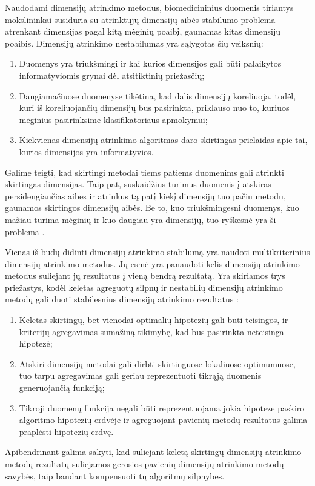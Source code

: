 Naudodami dimensijų atrinkimo metodus, biomedicininius duomenis tiriantys mokslininkai susiduria su atrinktųjų dimensijų aibės stabilumo problema - atrenkant dimensijas pagal kitą mėginių poaibį, gaunamas kitas dimensijų poaibis. Dimensijų atrinkimo nestabilumas yra sąlygotas šių veiksnių:
\begin{enumerate}
 \item Duomenys yra triukšmingi ir kai kurios dimensijos gali būti palaikytos informatyviomis grynai dėl atsitiktinių priežasčių;
 \item Daugiamačiuose duomenyse tikėtina, kad dalis dimensijų koreliuoja, todėl, kuri iš koreliuojančių dimensijų bus pasirinkta, priklauso nuo to, kuriuos mėginius pasirinksime klasifikatoriaus apmokymui;
 \item Kiekvienas dimensijų atrinkimo algoritmas daro skirtingas prielaidas apie tai, kurios dimensijos yra informatyvios.
\end{enumerate}
Galime teigti, kad skirtingi metodai tiems patiems duomenims gali atrinkti skirtingas dimensijas. Taip pat, suskaidžius turimus duomenis į atskiras persidengiančias aibes ir atrinkus tą patį kiekį dimensijų tuo pačiu metodu, gaunamos skirtingos dimensijų aibės. Be to, kuo triukšmingesni duomenys, kuo mažiau turima mėginių ir kuo daugiau yra dimensijų, tuo ryškesnė yra ši problema \cite{loscalzo2009consensus}. 

Vienas iš būdų didinti dimensijų atrinkimo stabilumą yra naudoti multikriterinius dimensijų atrinkimo metodus. Jų esmė yra panaudoti kelis dimensijų atrinkimo metodus suliejant jų rezultatus į vieną bendrą rezultatą. Yra skiriamos trys priežastys, kodėl keletas agreguotų silpnų ir nestabilių dimensijų atrinkimo metodų gali duoti stabilesnius dimensijų atrinkimo rezultatus \cite{dietterich2000ensemble}:
\begin{enumerate}
 \item Keletas skirtingų, bet vienodai optimalių hipotezių gali būti teisingos, ir kriterijų agregavimas sumažiną tikimybę, kad bus pasirinkta neteisinga  hipotezė;
 \item Atskiri dimensijų metodai gali dirbti skirtinguose lokaliuose optimumuose, tuo tarpu agregavimas gali geriau reprezentuoti tikrąją  duomenis generuojančią funkciją;
 \item Tikroji duomenų funkcija negali būti reprezentuojama jokia hipoteze paskiro algoritmo hipotezių erdvėje ir agreguojant pavienių metodų rezultatus galima praplėsti hipotezių erdvę.
\end{enumerate}
Apibendrinant galima sakyti, kad suliejant keletą skirtingų dimensijų atrinkimo metodų rezultatų suliejamos gerosios pavienių dimensijų atrinkimo metodų savybės, taip bandant kompensuoti tų algoritmų silpnybes.

